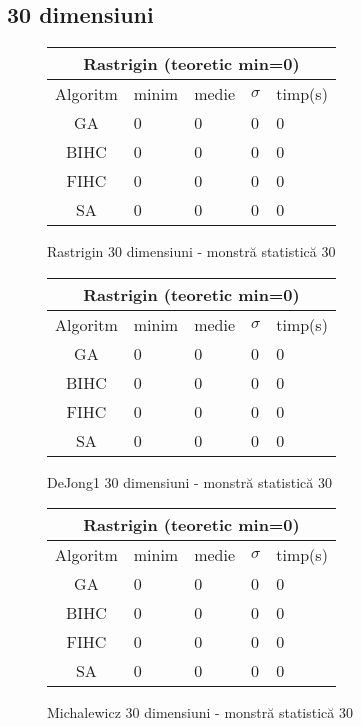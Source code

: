 \documentclass{article}
\begin{document}
\clearpage
\subsection{30 dimensiuni}


\begin{figure}[!h]
\begin{tabular}{||c|||l|l|l|l||}
  \hline
  \multicolumn{5}{||c||}{Rastrigin (teoretic min=0)} \\ \hline
  Algoritm & minim & medie & $\sigma$ & timp(s) \\ \hline \hline
  GA & 0 & 0 & 0 & 0 \\ \hline
  BIHC & 0 & 0 & 0 & 0\\ \hline
  FIHC & 0 & 0 & 0 & 0 \\ \hline
  SA & 0 & 0 & 0 & 0 \\ \hline
\end{tabular}
\caption{Rastrigin 30 dimensiuni - monstră statistică 30} 
\end{figure}

\begin{figure}[!h]
\begin{tabular}{||c|||l|l|l|l||}
  \hline
  \multicolumn{5}{||c||}{Rastrigin (teoretic min=0)} \\ \hline
  Algoritm & minim & medie & $\sigma$ & timp(s) \\ \hline \hline
  GA & 0 & 0 & 0 & 0 \\ \hline
  BIHC & 0 & 0 & 0 & 0\\ \hline
  FIHC & 0 & 0 & 0 & 0 \\ \hline
  SA & 0 & 0 & 0 & 0 \\ \hline
\end{tabular}
\caption{DeJong1 30 dimensiuni - monstră statistică 30} 
\end{figure}

\begin{figure}[!h]
\begin{tabular}{||c|||l|l|l|l||}
  \hline
  \multicolumn{5}{||c||}{Rastrigin (teoretic min=0)} \\ \hline
  Algoritm & minim & medie & $\sigma$ & timp(s) \\ \hline \hline
  GA & 0 & 0 & 0 & 0 \\ \hline
  BIHC & 0 & 0 & 0 & 0\\ \hline
  FIHC & 0 & 0 & 0 & 0 \\ \hline
  SA & 0 & 0 & 0 & 0 \\ \hline
\end{tabular}
\caption{Michalewicz 30 dimensiuni - monstră statistică 30} 
\end{figure}
\end{document}
